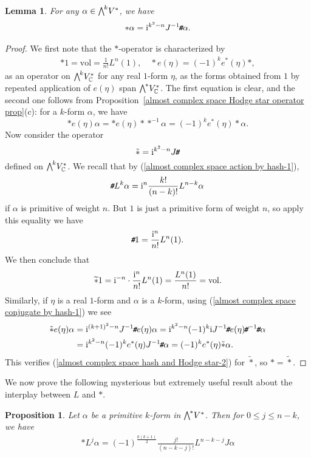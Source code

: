 \documentclass[11pt]{book}
\newtheorem{lemma}[theorem]{Lemma}
\newtheorem{proposition}[theorem]{Proposition}
\theoremstyle{definition}
\begin{document}
\begin{lemma}\label{almost complex space hash and Hodge star}
For any $\alpha\in\bigw^kV^*$, we have
\begin{align}\label{almost complex space hash and Hodge star-1}
\ast\alpha=\mathrm{i}^{k^2-n}J^{-1}\!\textit{\texttt{\#}}\alpha.
\end{align}
\end{lemma}
\begin{proof}
We first note that the $\ast$-operator is characterized by
\begin{align}\label{almost complex space hash and Hodge star-2}
\ast 1=\mathrm{vol}=\frac{1}{n!}L^n(1),\quad  \ast e(\eta)=(-1)^ke^*(\eta)\ast,
\end{align}
as an operator on $\bigw^kV^*_{\C}$ for any real $1$-form $\eta$, as the forms obtained from $1$ by repeated application of $e(\eta)$ span $\bigw^*V^*_{\C}$. The first equation is clear, and the second one follows from Proposition~\ref{almost complex space Hodge star operator prop}(c): for a $k$-form $\alpha$, we have
\[\ast e(\eta)\alpha=\ast e(\eta)\ast\ast^{-1}\alpha=(-1)^ke^*(\eta)\ast\alpha.\]
Now consider the operator
\[\tilde{\ast}=\mathrm{i}^{k^2-n}J\!\textit{\texttt{\#}}\]
defined on $\bigw^kV^*_{\C}$. We recall that by (\ref{almost complex space action by hash-1}),
\[\!\textit{\texttt{\#}} L^k\alpha=\mathrm{i}^n\frac{k!}{(n-k)!}L^{n-k}\alpha\]
if $\alpha$ is primitive of weight $n$. But $1$ is just a primitive form of weight $n$, so apply this equality we have
\[\!\textit{\texttt{\#}} 1=\frac{\mathrm{i}^n}{n!}L^{n}(1).\]
We then conclude that
\[\widetilde{\ast}1=\mathrm{i}^{-n}\cdot\frac{\mathrm{i}^n}{n!}L^n(1)=\frac{L^n(1)}{n!}=\mathrm{vol}.\]
Similarly, if $\eta$ is a real $1$-form and $\alpha$ is a $k$-form, using (\ref{almost complex space conjugate by hash-1}) we see 
\begin{align*}
\tilde{\ast}e(\eta)\alpha&=\mathrm{i}^{(k+1)^2-n}J^{-1}\!\textit{\texttt{\#}} e(\eta)\alpha=\mathrm{i}^{k^2-n}(-1)^k\mathrm{i} J^{-1}\!\textit{\texttt{\#}} e(\eta)\!\textit{\texttt{\#}}^{-1}\!\textit{\texttt{\#}}\alpha\\
&=\mathrm{i}^{k^2-n}(-1)^ke^*(\eta)J^{-1}\!\textit{\texttt{\#}}\alpha=(-1)^ke^*(\eta)\tilde{\ast}\alpha.
\end{align*}
This verifies (\ref{almost complex space hash and Hodge star-2}) for $\tilde{\ast}$, so $\ast=\tilde{\ast}$.
\end{proof}
We now prove the following mysterious but extremely useful result about the interplay between $L$ and $\ast$.
\begin{proposition}\label{almost complex space star and L power}
Let $\alpha$ be a primitive $k$-form in $\bigw^*V^*$. Then for $0\leq j\leq n-k$, we have
\begin{align}
\ast L^j\alpha=(-1)^{\frac{k(k+1)}{2}}\frac{j!}{(n-k-j)!}L^{n-k-j}J\alpha
\end{align}
\end{proposition}
\end{document}
